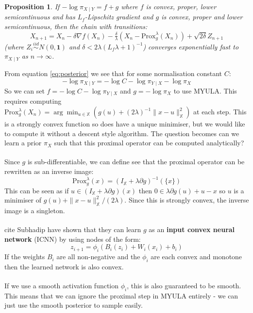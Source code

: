 \documentclass[a4paper,10pt]{article}
\newtheorem{prop}[thm]{Proposition}
\def\cred{\color{red}}
\numberwithin{equation}{section}
\numberwithin{thm}{section}
\begin{document}
\begin{prop}
If $- \log \pi_{X \mid Y} = f + g $ where $f$ is convex, proper, lower semicontinuous and has $L_f$-Lipschitz gradient and $g$ is convex, proper and lower semicontinuous, then the chain with transitions:
\begin{equation}
\label{eq:MYULA}
X_{n+1} = X_n - \delta \nabla f(X_n) - \tfrac{\delta}{\lambda} ( X_n - \text{Prox}_g^\lambda (X_n) ) + \sqrt{2 \delta} Z_{n+1} \tag{MYULA}
\end{equation}
(where $Z_i \overset{iid}{\sim} N(0,\mathbf{1})$ and $\delta < 2 \lambda ( L_f \lambda + 1)^{-1}$) converges exponentially fast to $\pi_{X \mid Y}$ as $n \rightarrow \infty$.
\end{prop}
From equation \ref{eq:posterior} we see that for some normalisation constant $C$:
\begin{equation}
- \log \pi_{X \mid Y} = - \log C - \log \pi_{Y \mid X} - \log \pi_X	
\end{equation}
So we can set $f = - \log C - \log \pi_{Y \mid X}$ and $g = - \log \pi_X$ to use MYULA. This requires computing $\text{Prox}_g^\lambda(X_n) = \arg\min_{u \in \mathbb{X} } ( g(u) + (2\lambda)^{-1} \| x - u \|_\mathbb{X}^2 )$ at each step. This is a strongly convex function so does have a unique minimiser, but we would like to compute it without a descent style algorithm. The question becomes can we learn a prior $\pi_X$ such that this proximal operator can be computed analytically? \\
\\
Since $g$ is sub-differentiable, we can define see that the proximal operator can be rewritten as an inverse image:
\begin{equation}
\text{Prox}_g^\lambda (x) = ( I_\mathbb{X} + \lambda \partial g )^{-1} ( \{x \} )	
\end{equation}
This can be seen as if $u \in (I_\mathbb{X} + \lambda \partial g)(x)$ then $0 \in \lambda \partial g (u) + u - x$ so $u$ is a minimiser of $g(u) + \| x - u \|^2_\mathbb{X} / (2 \lambda)$. Since this is strongly convex, the inverse image is a singleton. \\
\\
{\cred cite Subhadip} have shown that they can learn $g$ as an \textbf{input convex neural network} (ICNN) by using nodes of the form:
\[ z_{i+1} = \phi_i ( B_i (z_i) + W_i(x_i) + b_i) \]
If the weights $B_i$ are all non-negative and the $\phi_i$ are each convex and monotone then the learned network is also convex. \\
\\
If we use a smooth activation function $\phi_i$, this is also guaranteed to be smooth. This means that we can ignore the proximal step in MYULA entirely - we can just use the smooth posterior to sample easily. 
\end{document}
